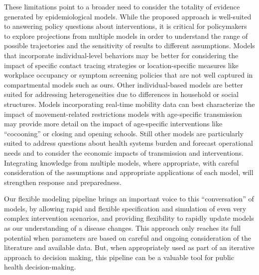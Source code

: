These limitations point to a broader need to consider the totality of evidence generated by epidemiological models. While the proposed approach is well-suited to answering policy questions about interventions, it is critical for policymakers to explore projections from multiple models in order to understand the range of possible trajectories and the sensitivity of results to different assumptions. Models that incorporate individual-level behaviors may be better for considering the impact of specific contact tracing strategies or location-specific measures like workplace occupancy or symptom screening policies that are not well captured in compartmental models such as ours\cite[-5\baselineskip]{Kucharski:EffectivenessIsolationTesting:2020,Firth:UsingRealworldNetwork:2020,Hinch:OpenABMCovid19AgentbasedModel:2020}. Other individual-based models are better suited for addressing heterogeneities due to differences in household or social structures\cite{Wilder:ModelingBetweenpopulationVariation:2020,Kerr:CovasimAgentbasedModel:2021}. Models incorporating real-time mobility data can best characterize the impact of movement-related restrictions\cite{Lai:EffectNonpharmaceuticalInterventions:2020} models with age-specific transmission may provide more detail on the impact of age-specific interventions like “cocooning”\cite{Duque:COVID19HowRelax:2020} or closing and opening schools\cite{Ferguson:ReportImpactNonpharmaceutical:2020}. Still other models are particularly suited to address questions about health systems burden and forecast operational needs\cite{Branas:FlatteningCurveIt:2020,LosAlamosNationalLaboratory:COVID19CasesDeaths,Weissman:LocallyInformedSimulation:2020} and to consider the economic impacts of transmission and interventions\cite{Acemoglu:OptimalTargetedLockdowns:2020,Silva:COVIDABSAgentbasedModel:2020}. Integrating knowledge from multiple models, where appropriate, with careful consideration of the assumptions and appropriate applications of each model, will strengthen response and preparedness\cite{Shea:HarnessingMultipleModels:2020}.


Our flexible modeling pipeline brings an important voice to this “conversation” of models, by allowing rapid and flexible specification and simulation of even very complex intervention scenarios, and providing flexibility to rapidly update models as our understanding of a disease changes. This approach only reaches its full potential when parameters are based on careful and ongoing consideration of the literature and available data. But, when appropriately used as part of an iterative approach to decision making, this pipeline can be a valuable tool for public health decision-making.

